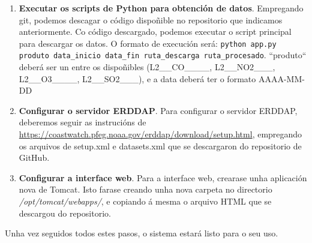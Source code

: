 \begin{enumerate}
\begin{lstlisting}
    [Service]
    Type=forking

    User=tomcat
    Group=tomcat

    Environment="JAVA_HOME=/usr/lib/jvm/java-1.11.0-openjdk-amd64"
    Environment="JAVA_OPTS=-Djava.security.egd=file:///dev/urandom"
    Environment="CATALINA_BASE=/opt/tomcat"
    Environment="CATALINA_HOME=/opt/tomcat"
    Environment="CATALINA_PID=/opt/tomcat/temp/tomcat.pid"
    Environment="CATALINA_OPTS=-Xms512M -Xmx1024M -server -XX:+UseParallelGC"

    ExecStart=/opt/tomcat/bin/startup.sh
    ExecStop=/opt/tomcat/bin/shutdown.sh

    RestartSec=10
    Restart=always

    [Install]
    WantedBy=multi-user.target
    \end{lstlisting}
    A continuación, recargarase o \textit{systemctl} con \texttt{sudo systemctl daemon-reload} e arrancarase o servizo de Tomcat con \texttt{sudo systemctl start tomcat}. Configurarase Tomcat para
    que arranque co sistema, mediante o comando \texttt{sudo systemctl enable tomcat}. Por último, executarase \texttt{sudo ufw allow 8080} para permitir tráfico polo porto 8080.
    \item \textbf{Executar os scripts de Python para obtención de datos}. Empregando git, podemos descagar o código dispoñible no repositorio que indicamos anteriormente. Co código descargado, 
    podemos executar o script principal para descargar os datos. O formato de execución será: \texttt{python app.py produto data\_inicio data\_fin ruta\_descarga ruta\_procesado}. ``produto`` deberá
    ser un entre os dispoñibles (L2\_\_CO\_\_\_\_, L2\_\_NO2\_\_\_, L2\_\_O3\_\_\_\_, L2\_\_SO2\_\_\_), e a data deberá ter o formato AAAA-MM-DD
    \item \textbf{Configurar o servidor ERDDAP}. Para configurar o servidor ERDDAP, deberemos seguir as instrucións de \url{https://coastwatch.pfeg.noaa.gov/erddap/download/setup.html}, empregando
    os arquivos de setup.xml e datasets.xml que se descargaron do repositorio de GitHub.
    \item \textbf{Configurar a interface web}. Para a interface web, crearase unha aplicación nova de Tomcat. Isto farase creando unha nova carpeta no directorio \textit{/opt/tomcat/webapps/}, e
    copiando á mesma o arquivo HTML que se descargou do repositorio.
\end{enumerate}

Unha vez seguidos todos estes pasos, o sistema estará listo para o seu uso.


